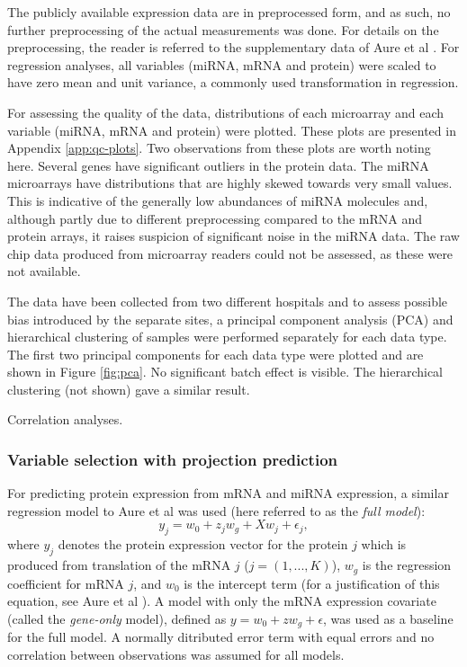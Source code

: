 The publicly available expression data are in preprocessed form, and as such,
no further preprocessing of the actual measurements was done. For details on
the preprocessing, the reader is referred to the supplementary data of Aure et
al \citep{Aure2015}. For regression analyses, all variables (miRNA, mRNA and
protein) were scaled to have zero mean and unit variance, a commonly
used transformation in regression.

For assessing the quality of the data, distributions of each microarray and each
variable (miRNA, mRNA and protein) were plotted. These plots are presented in
Appendix \ref{app:qc-plots}. Two observations from these plots are worth noting here.
Several genes have significant outliers in the protein data. The miRNA
microarrays have distributions that are highly skewed towards very small
values. This is indicative of the generally low abundances of miRNA molecules
and, although partly due to different preprocessing compared to the mRNA and
protein arrays, it raises suspicion of significant noise in the miRNA data.
The raw chip data produced from microarray readers could not be assessed, as
these were not available.

The data have been collected from two different hospitals and to assess
possible bias introduced by the separate sites, a principal component
analysis (PCA) and hierarchical clustering of samples were performed
separately for each data type. The first two principal components
for each data type were plotted and are shown in Figure \ref{fig:pca}.
No significant batch effect is visible. The hierarchical clustering (not shown)
gave a similar result.

Correlation analyses.


\subsubsection{Variable selection with projection prediction}\label{sec:PPVS}

For predicting protein expression from mRNA and miRNA expression, a similar
regression model to Aure et al was used (here referred to as the \emph{full
model}):
\begin{equation}
	y_j = w_0 + z_j w_g + X w_j + \epsilon_j,
\end{equation}
where $y_j$ denotes the protein expression vector for the protein $j$ which
is produced from translation of the mRNA $j$ ($j = (1, ..., K)$), $w_g$
is the regression coefficient for mRNA $j$, and $w_0$ is the intercept term
(for a justification of this equation, see Aure et al \citep{Aure2015}).
A model with only the mRNA expression covariate (called the \emph{gene-only} model),
defined as $y = w_0 + z w_g + \epsilon$, was used as a baseline for the full model.
A normally ditributed error term with equal errors and no correlation
between observations was assumed for all models.

